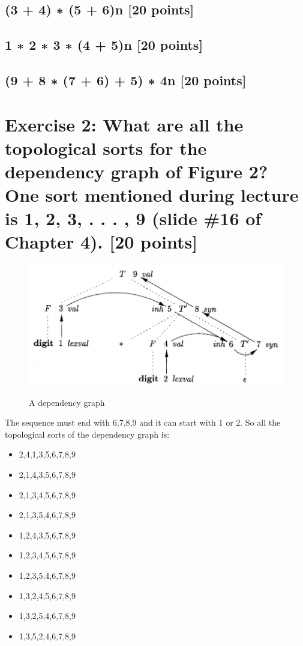 \documentclass{article}
\begin{document}
        \subsection{(3 + 4) ∗ (5 + 6)n [20 points]}
        \subsection{1 ∗ 2 ∗ 3 ∗ (4 + 5)n [20 points]}
        \subsection{(9 + 8 ∗ (7 + 6) + 5) ∗ 4n [20 points]}
    \section{Exercise 2: What are all the topological sorts for the dependency graph of Figure 2? One 
    sort mentioned during lecture is 1, 2, 3, . . . , 9 (slide \#16 of Chapter 4). [20 points]}
        \begin{figure}[H]
            \centering
            \caption{A dependency graph}
            \includegraphics[scale=0.5]{./Q2_T.png}
            \label{fig:label}
        \end{figure}
        The sequence must end with 6,7,8,9 and it can start with 1 or 2. So all the topological sorts of the dependency 
        graph is:
        \begin{itemize}
            \item 2,4,1,3,5,6,7,8,9
            \item 2,1,4,3,5,6,7,8,9
            \item 2,1,3,4,5,6,7,8,9
            \item 2,1,3,5,4,6,7,8,9
            \item 1,2,4,3,5,6,7,8,9
            \item 1,2,3,4,5,6,7,8,9
            \item 1,2,3,5,4,6,7,8,9
            \item 1,3,2,4,5,6,7,8,9
            \item 1,3,2,5,4,6,7,8,9
            \item 1,3,5,2,4,6,7,8,9
        \end{itemize}
\end{document}

